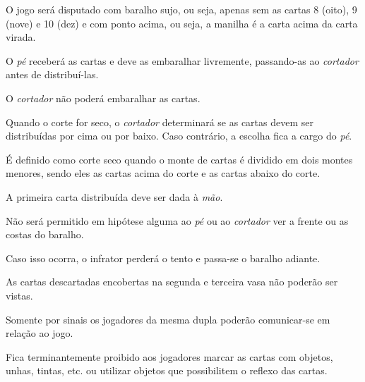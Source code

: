 \begin{article}
	O jogo será disputado com baralho sujo, ou seja, apenas sem as cartas 8 (oito), 9 (nove) e 10 (dez) e com ponto acima, ou seja, a manilha é a carta acima da carta virada.
\end{article}

\begin{article}
	O \textit{pé} receberá as cartas e deve as embaralhar livremente, passando-as ao \textit{cortador} antes de distribuí-las.

	\begin{xparagraph}
		O \textit{cortador} não poderá embaralhar as cartas.
	\end{xparagraph}

	\begin{xparagraph}
		Quando o corte for seco, o \textit{cortador} determinará se as cartas devem ser distribuídas por cima ou por baixo. Caso contrário, a escolha fica a cargo do \textit{pé}.
	\end{xparagraph}

	\begin{xparagraph}
		É definido como corte seco quando o monte de cartas é dividido em dois montes menores, sendo eles as cartas acima do corte e as cartas abaixo do corte.

	\end{xparagraph}

	\begin{xparagraph}
		A primeira carta distribuída deve ser dada à \textit{mão}.
	\end{xparagraph}
\end{article}

\begin{article}
	Não será permitido em hipótese alguma ao \textit{pé} ou ao \textit{cortador} ver a frente ou as costas do baralho.

	\begin{xparagraph}
		Caso isso ocorra, o infrator perderá o tento e passa-se o baralho adiante.
	\end{xparagraph}
\end{article}

\begin{article}
	As cartas descartadas encobertas na segunda e terceira vasa não poderão ser vistas.
\end{article}

\begin{article}
	Somente por sinais os jogadores da mesma dupla poderão comunicar-se em relação ao jogo.

	\begin{xparagraph}
		Fica terminantemente proibido aos jogadores marcar as cartas com objetos, unhas, tintas, etc. ou utilizar objetos que possibilitem o reflexo das cartas.
	\end{xparagraph}
\end{article}

